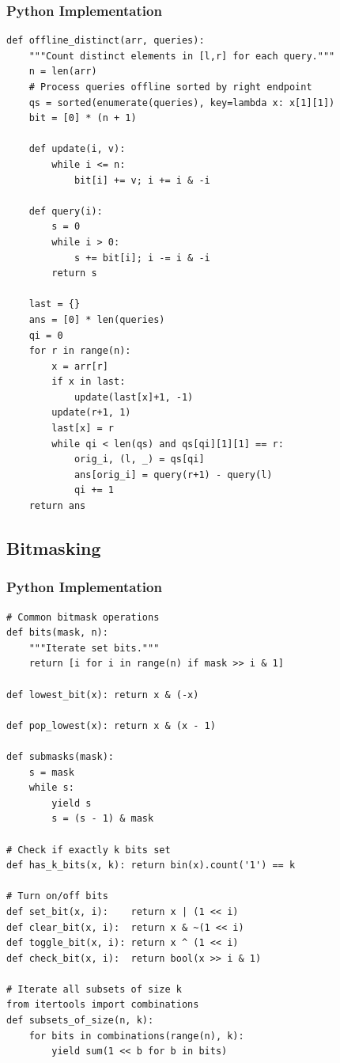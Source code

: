 \documentclass[10pt,a4paper]{article}
\theoremstyle{cpstyle}
\begin{document}
\subsubsection{Python Implementation}
\begin{lstlisting}[caption={Offline range distinct count using BIT}]
def offline_distinct(arr, queries):
    """Count distinct elements in [l,r] for each query."""
    n = len(arr)
    # Process queries offline sorted by right endpoint
    qs = sorted(enumerate(queries), key=lambda x: x[1][1])
    bit = [0] * (n + 1)

    def update(i, v):
        while i <= n:
            bit[i] += v; i += i & -i

    def query(i):
        s = 0
        while i > 0:
            s += bit[i]; i -= i & -i
        return s

    last = {}
    ans = [0] * len(queries)
    qi = 0
    for r in range(n):
        x = arr[r]
        if x in last:
            update(last[x]+1, -1)
        update(r+1, 1)
        last[x] = r
        while qi < len(qs) and qs[qi][1][1] == r:
            orig_i, (l, _) = qs[qi]
            ans[orig_i] = query(r+1) - query(l)
            qi += 1
    return ans
\end{lstlisting}

\subsection{Bitmasking}

\subsubsection{Python Implementation}
\begin{lstlisting}[caption={Bitmasking tricks for competitive programming}]
# Common bitmask operations
def bits(mask, n):
    """Iterate set bits."""
    return [i for i in range(n) if mask >> i & 1]

def lowest_bit(x): return x & (-x)

def pop_lowest(x): return x & (x - 1)

def submasks(mask):
    s = mask
    while s:
        yield s
        s = (s - 1) & mask

# Check if exactly k bits set
def has_k_bits(x, k): return bin(x).count('1') == k

# Turn on/off bits
def set_bit(x, i):    return x | (1 << i)
def clear_bit(x, i):  return x & ~(1 << i)
def toggle_bit(x, i): return x ^ (1 << i)
def check_bit(x, i):  return bool(x >> i & 1)

# Iterate all subsets of size k
from itertools import combinations
def subsets_of_size(n, k):
    for bits in combinations(range(n), k):
        yield sum(1 << b for b in bits)
\end{lstlisting}
\end{document}
